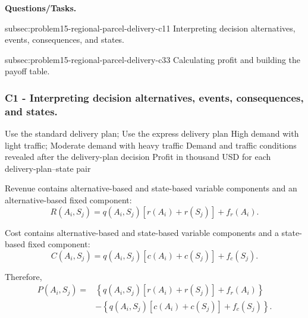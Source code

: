 	\textbf{Questions/Tasks.}
	\begin{enumerate}
		\CriterionTask
		{subsec:problem15-regional-parcel-delivery-c1}{1}
		{Interpreting decision alternatives, events, consequences, and states.}

		\CriterionTask
		{subsec:problem15-regional-parcel-delivery-c3}{3}
		{Calculating profit and building the payoff table.}
	\end{enumerate}

	\subsubsection*{C1 - Interpreting decision alternatives, events, consequences, and states.}
	\label{subsec:problem15-regional-parcel-delivery-c1}

	\DecisionElementsTable
	{Use the standard delivery plan; Use the express delivery plan}
	{High demand with light traffic; Moderate demand with heavy traffic}
	{Demand and traffic conditions revealed after the delivery-plan decision}
	{Profit in thousand USD for each delivery-plan--state pair}

	Revenue contains alternative-based and state-based variable components and
	an alternative-based fixed component:
	\[
	R(A_i,S_j)
	=
	q(A_i,S_j)
	\left[
	r(A_i)+r(S_j)
	\right]
	+
	f_r(A_i).
	\]

	Cost contains alternative-based and state-based variable components and a
	state-based fixed component:
	\[
	C(A_i,S_j)
	=
	q(A_i,S_j)
	\left[
	c(A_i)+c(S_j)
	\right]
	+
	f_c(S_j).
	\]

	Therefore,
	\[
	\begin{aligned}
		P(A_i,S_j)
		={}&
		\left\{
		q(A_i,S_j)
		\left[
		r(A_i)+r(S_j)
		\right]
		+
		f_r(A_i)
		\right\}
		\\
		&-
		\left\{
		q(A_i,S_j)
		\left[
		c(A_i)+c(S_j)
		\right]
		+
		f_c(S_j)
		\right\}.
	\end{aligned}
	\]


